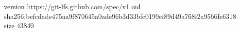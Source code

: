 version https://git-lfs.github.com/spec/v1
oid sha256:befcdade475aa9f870645a0ade96b3d33bfc0199ef89d49a768f2a9566fe6318
size 43840
